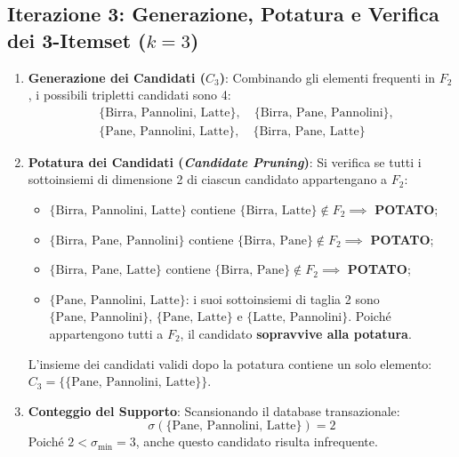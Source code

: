 \subsection{Iterazione 3: Generazione, Potatura e Verifica dei 3-Itemset ($k=3$)}
\begin{enumerate}
    \item \textbf{Generazione dei Candidati ($C_3$)}: Combinando gli elementi frequenti in $F_2$, i possibili tripletti candidati sono 4:
    \begin{equation}
    \begin{aligned}
    & \{\text{Birra, Pannolini, Latte}\}, \quad \{\text{Birra, Pane, Pannolini}\}, \\
    & \{\text{Pane, Pannolini, Latte}\}, \quad \{\text{Birra, Pane, Latte}\}
    \end{aligned}
    \end{equation}
    \item \textbf{Potatura dei Candidati (\textit{Candidate Pruning})}: Si verifica se tutti i sottoinsiemi di dimensione 2 di ciascun candidato appartengano a $F_2$:
    \begin{itemize}[noitemsep]
        \item $\{\text{Birra, Pannolini, Latte}\}$ contiene $\{\text{Birra, Latte}\} \notin F_2 \implies$ \textbf{POTATO};
        \item $\{\text{Birra, Pane, Pannolini}\}$ contiene $\{\text{Birra, Pane}\} \notin F_2 \implies$ \textbf{POTATO};
        \item $\{\text{Birra, Pane, Latte}\}$ contiene $\{\text{Birra, Pane}\} \notin F_2 \implies$ \textbf{POTATO};
        \item $\{\text{Pane, Pannolini, Latte}\}$: i suoi sottoinsiemi di taglia 2 sono $\{\text{Pane, Pannolini}\}$, $\{\text{Pane, Latte}\}$ e $\{\text{Latte, Pannolini}\}$. Poiché appartengono tutti a $F_2$, il candidato \textbf{sopravvive alla potatura}.
    \end{itemize}
    L'insieme dei candidati validi dopo la potatura contiene un solo elemento: $C_3 = \{\{\text{Pane, Pannolini, Latte}\}\}$.
    \item \textbf{Conteggio del Supporto}: Scansionando il database transazionale:
    \begin{equation}
    \sigma(\{\text{Pane, Pannolini, Latte}\}) = 2
    \end{equation}
    Poiché $2 < \sigma_{\min} = 3$, anche questo candidato risulta infrequente.
\end{enumerate}

